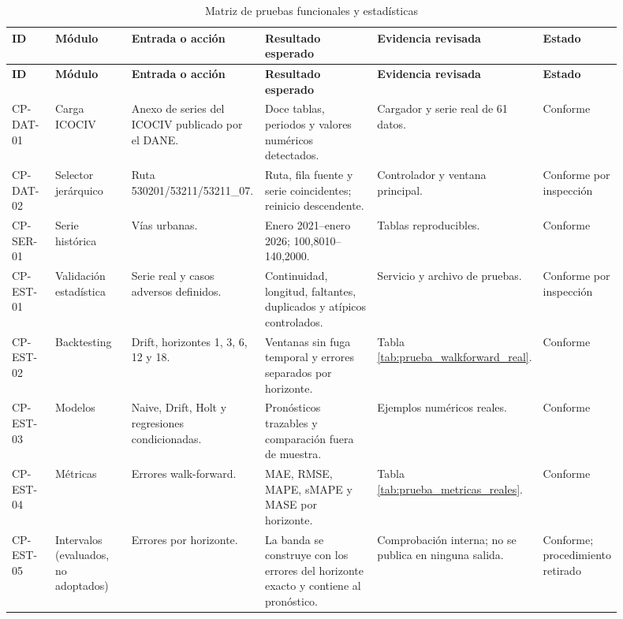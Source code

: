 \documentclass[12pt,letterpaper]{article}
\newcommand{\ICOCIV}{ICOCIV}
\newcommand{\DANE}{DANE}
\begin{document}
\begin{landscape}
\scriptsize
\begin{longtable}{@{}>{\raggedright\arraybackslash}p{0.08\linewidth}>{\raggedright\arraybackslash}p{0.14\linewidth}>{\raggedright\arraybackslash}p{0.22\linewidth}>{\raggedright\arraybackslash}p{0.25\linewidth}>{\raggedright\arraybackslash}p{0.13\linewidth}>{\raggedright\arraybackslash}p{0.08\linewidth}@{}}
\caption{Matriz de pruebas funcionales y estadísticas}\label{tab:matriz_pruebas}\\[\baselineskip]
\toprule
\textbf{ID} & \textbf{Módulo} & \textbf{Entrada o acción} & \textbf{Resultado esperado} & \textbf{Evidencia revisada} & \textbf{Estado} \\
\midrule
\endfirsthead
\toprule
\textbf{ID} & \textbf{Módulo} & \textbf{Entrada o acción} & \textbf{Resultado esperado} & \textbf{Evidencia revisada} & \textbf{Estado} \\
\midrule
\endhead
CP-DAT-01 & Carga \ICOCIV{} & Anexo de series del \ICOCIV{} publicado por el \DANE. & Doce tablas, periodos y valores numéricos detectados. & Cargador y serie real de 61 datos. & Conforme \\
CP-DAT-02 & Selector jerárquico & Ruta 530201/53211/53211\_07. & Ruta, fila fuente y serie coincidentes; reinicio descendente. & Controlador y ventana principal. & Conforme por inspección \\
CP-SER-01 & Serie histórica & Vías urbanas. & Enero 2021--enero 2026; 100,8010--140,2000. & Tablas reproducibles. & Conforme \\
CP-EST-01 & Validación estadística & Serie real y casos adversos definidos. & Continuidad, longitud, faltantes, duplicados y atípicos controlados. & Servicio y archivo de pruebas. & Conforme por inspección \\
CP-EST-02 & Backtesting & Drift, horizontes 1, 3, 6, 12 y 18. & Ventanas sin fuga temporal y errores separados por horizonte. & Tabla \ref{tab:prueba_walkforward_real}. & Conforme \\
CP-EST-03 & Modelos & Naive, Drift, Holt y regresiones condicionadas. & Pronósticos trazables y comparación fuera de muestra. & Ejemplos numéricos reales. & Conforme \\
CP-EST-04 & Métricas & Errores walk-forward. & MAE, RMSE, MAPE, sMAPE y MASE por horizonte. & Tabla \ref{tab:prueba_metricas_reales}. & Conforme \\
CP-EST-05 & Intervalos (evaluados, no adoptados) & Errores por horizonte. & La banda se construye con los errores del horizonte exacto y contiene al pronóstico. & Comprobación interna; no se publica en ninguna salida. & Conforme; procedimiento retirado \\

\end{longtable}
\end{landscape}
\end{document}
